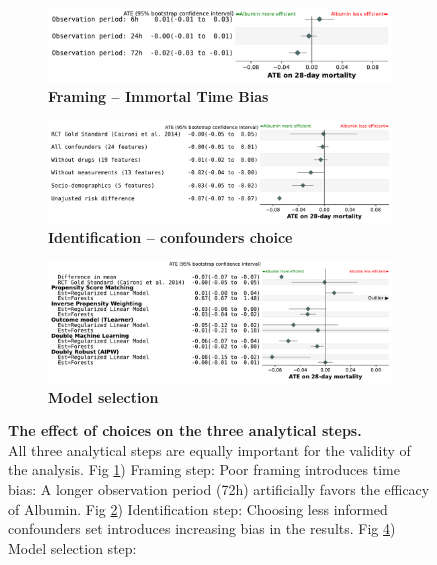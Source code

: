 \documentclass[10pt,letterpaper]{article}
\begin{document}
\begin{figure}[h!]
  \begin{subfigure}[b]{\linewidth}
    \caption{\bfseries Framing -- Immortal Time Bias}\label{fig:vibration:itb}
    \includegraphics[width=0.765\linewidth, right]{img_final/Fig3a.pdf}
  \end{subfigure}
  \vfill
  \begin{subfigure}[b]{\linewidth}
    \centering
    \caption{\bfseries Identification -- confounders choice}\label{fig:vibration:confounders}
    \includegraphics[width=.9\linewidth, right]{img_final/Fig3b.pdf}
  \end{subfigure}
  \vfill
  \begin{subfigure}[b]{\linewidth}
    \centering
    \caption{\bfseries Model selection}\label{fig:vibration:models}
    \includegraphics[width=0.891\linewidth, right]{img_final/Fig3c.pdf}
  \end{subfigure}
  \vfill
  \caption{\textbf{The effect of choices on the three
      analytical steps.}\\ All three
    analytical steps are equally important for the validity of the analysis.
    Fig \ref{fig:vibration:itb}) Framing step: Poor framing introduces time bias: A longer
    observation period (72h) artificially favors the efficacy of Albumin.
    Fig \ref{fig:vibration:confounders}) Identification step: Choosing less informed confounders set
    introduces increasing bias in the results. Fig \ref{fig:vibration:models}) Model selection step:
}
\end{figure}
\end{document}
